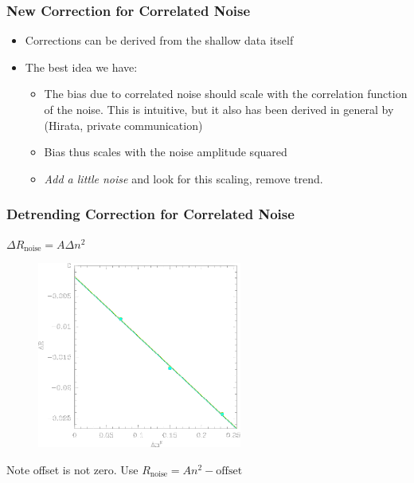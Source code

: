 \documentclass{beamer}
\begin{document}
\frame
{
    \frametitle{New Correction for Correlated Noise}

 
    \begin{itemize}

        \item Corrections can be derived from the shallow data itself

        \item The best idea we have:
            \begin{itemize}

                \item The bias due to correlated noise should scale with the
                    {\color{gold} correlation function} of the noise.
                    This is intuitive, but it also has been derived in general
                    by (Hirata, private communication)

                \item Bias thus scales with the {\color{gold} noise} amplitude squared

                \item {\em Add a little noise} and look for this scaling, remove trend.

            \end{itemize}
    \end{itemize}

}



\frame
{
    \frametitle{Detrending Correction for Correlated Noise}

    {\color{gold} $\Delta R_{\mathrm{noise}} = A \Delta n^2$ }

    \begin{figure}
        \includegraphics[width=0.6\textwidth]{run-bd13mcal-dt01-Rnoise-detrend-neg.png}
    \end{figure}

    Note offset is not zero.  Use 
    {\color{lightskyblue} $R_{\mathrm{noise}} = A n^2 - \mathrm{offset}$}
}
\end{document}

